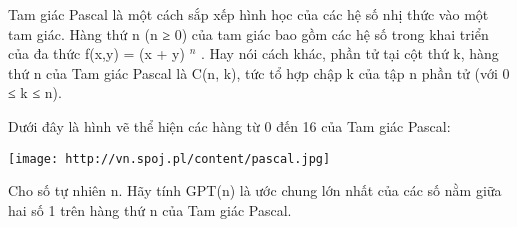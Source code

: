 Tam giác Pascal là một cách sắp xếp hình học của các hệ số nhị thức vào một tam giác. Hàng thứ n (n ≥ 0) của tam giác bao gồm các hệ số trong khai triển của đa thức f(x,y) = (x + y)   $^    n   $   . Hay nói cách khác, phần tử tại cột thứ k, hàng thứ n của Tam giác Pascal là C(n, k), tức tổ hợp chập k của tập n phần tử (với 0 ≤ k ≤ n).  

   Dưới đây là hình vẽ thể hiện các hàng từ 0 đến 16 của Tam giác Pascal:  


\texttt{[image: http://vn.spoj.pl/content/pascal.jpg]}



   Cho số tự nhiên n. Hãy tính GPT(n) là ước chung lớn nhất của các số nằm giữa hai số 1 trên hàng thứ n của Tam giác Pascal.  

\